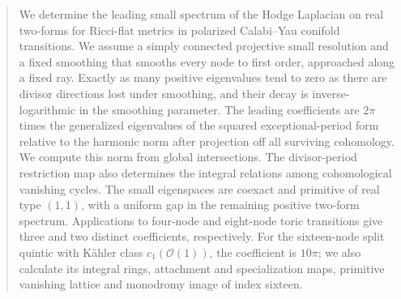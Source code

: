 

\begin{abstract}
We determine the leading small spectrum of the Hodge Laplacian on real
two-forms for Ricci-flat metrics in polarized Calabi--Yau conifold
transitions. We assume a simply connected projective small resolution
and a fixed smoothing that smooths every node to first order, approached
along a fixed ray. Exactly
as many positive eigenvalues tend to zero as there are divisor directions
lost under smoothing, and their decay is inverse-logarithmic in the
smoothing parameter. The leading coefficients are $2\pi$ times the
generalized eigenvalues of the squared exceptional-period form relative
to the harmonic norm after projection off all surviving cohomology.
We compute this norm from global intersections. The divisor-period
restriction map also determines the integral relations among
cohomological vanishing cycles. The small eigenspaces are coexact and
primitive of real type $(1,1)$, with a uniform gap in the remaining
positive two-form spectrum. Applications to four-node and eight-node
toric transitions give three and two distinct coefficients, respectively.
For the sixteen-node split quintic with K\"ahler class
$c_1(\mathcal O(1))$, the coefficient is $10\pi$; we also
calculate its integral rings, attachment and specialization maps,
primitive vanishing lattice and monodromy image of index sixteen.
\end{abstract}
\maketitle










\appendix




